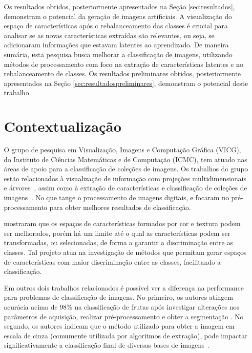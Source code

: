 Os resultados obtidos, posteriormente apresentados na Seção \ref{sec:resultados}, demonstram o potencial da geração de imagens artificiais. A visualização do espaço de características após o rebalanceamento das classes é crucial para analisar se as novas características extraídas são relevantes, ou seja, se adicionaram informações que estavam latentes ao aprendizado. De maneira sumária, {\textbf esta pesquisa busca melhorar a classificação de imagens, utilizando métodos de processamento com foco na extração de características latentes e no rebalanceamento de classes.} Os resultados preliminares obtidos, posteriormente apresentados na Seção \ref{sec:resultadospreliminares}, demonstram o potencial deste trabalho.

\section{Contextualização}

O grupo de pesquisa em Visualização, Imagens e Computação Gráfica (VICG), do Instituto de Ciências Matemáticas e de Computação (ICMC), tem atuado nas áreas de apoio para a classificação de coleções de imagens. Os trabalhos do grupo estão relacionados à visualização de informação com projeções multidimensionais e árvores~\cite{Joia2011}, assim como à extração de características e classificação de coleções de imagens~\cite{Paiva2011}. No que tange o processamento de imagens digitais,  e  focaram no pré-processamento para obter melhores resultados de classificação.

 mostraram que os espaços de características formados por cor e textura podem ser melhorados, porém há um limite até o qual as características podem ser transformadas, ou selecionadas, de forma a garantir a discriminação entre as classes. Tal projeto atua na investigação de métodos que permitam gerar espaços de características com maior discriminação entre as classes, facilitando a classificação.

Em outros dois trabalhos relacionados é possível ver a diferença na performance para problemas de classificação de imagens. No primeiro, os autores atingem acurácia acima de 98\% na classificação de frutas após investigar alterações nos parâmetros de aquisição, realizar pré-processamento e obter a segmentação \cite{Rocha2010}. No segundo, os autores indicam que o método utilizado para obter a imagem em escala de cinza (comumente utilizada por algoritmos de extração), pode impactar significativamente a classificação final de diversas bases de imagens~\cite{Kanan2012}.

